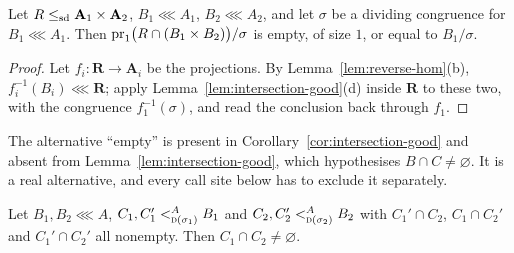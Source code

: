 \begin{corollary}\label{cor:intersection-good}
Let $R\sdle\mathbf A_{1}\times\mathbf A_{2}$, $B_{1}\lll A_{1}$,
$B_{2}\lll A_{2}$, and let $\sigma$ be a dividing congruence for
$B_{1}\lll A_{1}$. Then $\proj_{1}\bigl(R\cap(B_{1}\times B_{2})\bigr)/\sigma$
is empty, of size $1$, or equal to $B_{1}/\sigma$.
\end{corollary}

\begin{proof}
Let $f_{i}:\mathbf R\to\mathbf A_{i}$ be the projections. By
Lemma~\ref{lem:reverse-hom}(b), $f_{i}^{-1}(B_{i})\lll\mathbf R$; apply
Lemma~\ref{lem:intersection-good}(d) inside $\mathbf R$ to these two, with the
congruence $f_{1}^{-1}(\sigma)$, and read the conclusion back through $f_{1}$.
\end{proof}

\begin{hazard}\label{haz:cor-intersection}
The alternative ``empty'' is present in
Corollary~\ref{cor:intersection-good} and absent from
Lemma~\ref{lem:intersection-good}, which hypothesises $B\cap C\neq\varnothing$.
It is a real alternative, and every call site below has to exclude it
separately.
\end{hazard}

\begin{lemma}\label{lem:parallelogram-D}
Let $B_{1},B_{2}\lll A$, $C_{1},C_{1}'\subt[A]{\TD(\sigma_{1})}B_{1}$ and
$C_{2},C_{2}'\subt[A]{\TD(\sigma_{2})}B_{2}$ with $C_{1}'\cap C_{2}$,
$C_{1}\cap C_{2}'$ and $C_{1}'\cap C_{2}'$ all nonempty. Then
$C_{1}\cap C_{2}\neq\varnothing$.
\end{lemma}

